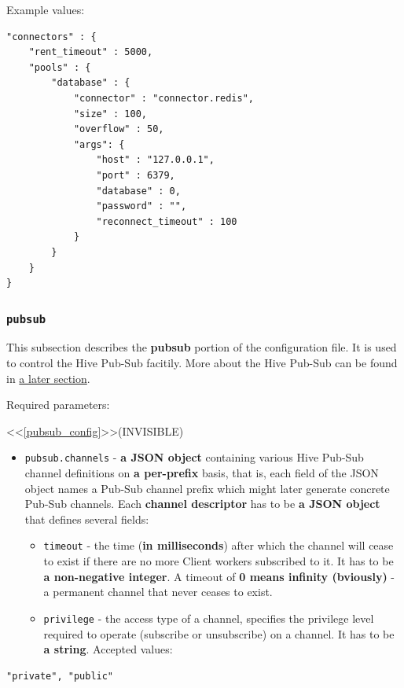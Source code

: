 \documentclass[a4paper]{article}
\begin{document}
\noindent
Example values:


\begin{verbatim}
"connectors" : {
    "rent_timeout" : 5000,
    "pools" : {
        "database" : {
            "connector" : "connector.redis",
            "size" : 100,
            "overflow" : 50,
            "args": {
                "host" : "127.0.0.1",
                "port" : 6379,
                "database" : 0,
                "password" : "",
                "reconnect_timeout" : 100
            }
        }
    }
}
\end{verbatim}
\subsubsection{\texttt{pubsub}}
\label{sec-3-1-5}

This subsection describes the \textbf{pubsub} portion of the configuration file. It is used to control the Hive Pub-Sub facitily. More about the Hive Pub-Sub can be found in \hyperref[sec-7-3]{a later section}.

\noindent
Required parameters:

<<\ref{pubsub_config}>>(INVISIBLE)

\begin{itemize}
\item \texttt{pubsub.channels} - \textbf{a JSON object} containing various Hive Pub-Sub channel definitions on \textbf{a per-prefix} basis, that is, each field of the JSON object names a Pub-Sub channel prefix which might later generate concrete Pub-Sub channels. Each \textbf{channel descriptor} has to be \textbf{a JSON object} that defines several fields:
\begin{itemize}
\item \texttt{timeout} - the time (\textbf{in milliseconds}) after which the channel will cease to exist if there are no more Client workers subscribed to it. It has to be \textbf{a non-negative integer}. A timeout of \textbf{0 means infinity (bviously)} - a permanent channel that never ceases to exist.
\item \texttt{privilege} - the access type of a channel, specifies the privilege level required to operate (subscribe or unsubscribe) on a channel. It has to be \textbf{a string}. Accepted values:
\end{itemize}
\end{itemize}


\begin{verbatim}
"private", "public"
\end{verbatim}
\end{document}
